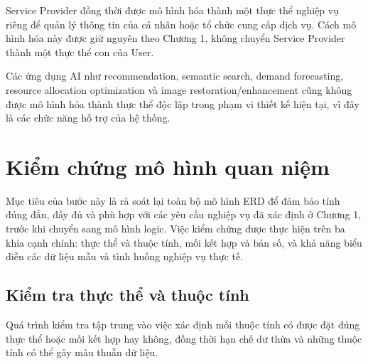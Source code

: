 Service Provider đồng thời được mô hình hóa thành một thực thể nghiệp vụ riêng để quản lý thông tin của cá nhân hoặc tổ chức cung cấp dịch vụ. Cách mô hình hóa này được giữ nguyên theo Chương 1, không chuyển Service Provider thành một thực thể con của User.

Các ứng dụng AI như recommendation, semantic search, demand forecasting, resource allocation optimization và image restoration/enhancement cũng không được mô hình hóa thành thực thể độc lập trong phạm vi thiết kế hiện tại, vì đây là các chức năng hỗ trợ của hệ thống.

\section{Kiểm chứng mô hình quan niệm}

Mục tiêu của bước này là rà soát lại toàn bộ mô hình ERD để đảm bảo tính đúng đắn, đầy đủ và phù hợp với các yêu cầu nghiệp vụ đã xác định ở Chương 1, trước khi chuyển sang mô hình logic. Việc kiểm chứng được thực hiện trên ba khía cạnh chính: thực thể và thuộc tính, mối kết hợp và bản số, và khả năng biểu diễn các dữ liệu mẫu và tình huống nghiệp vụ thực tế.

\subsection{Kiểm tra thực thể và thuộc tính}

Quá trình kiểm tra tập trung vào việc xác định mỗi thuộc tính có được đặt đúng thực thể hoặc mối kết hợp hay không, đồng thời hạn chế dư thừa và những thuộc tính có thể gây mâu thuẫn dữ liệu.

